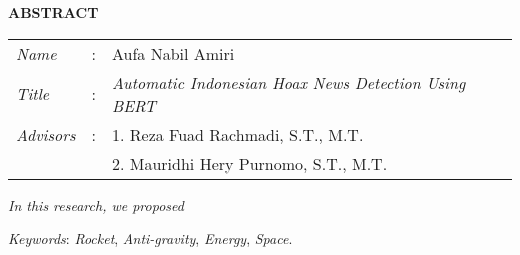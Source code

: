 \begin{center}
  \large\textbf{ABSTRACT}
\end{center}


\vspace{2ex}

\begingroup
\setlength{\tabcolsep}{0pt}

\noindent
\begin{tabularx}{\textwidth}{l >{\centering}m{3em} X}
  \emph{Name}     & : & Aufa Nabil Amiri                                             \\

  \emph{Title}    & : & \emph{ Automatic Indonesian Hoax News Detection Using BERT } \\

  \emph{Advisors} & : & 1. Reza Fuad Rachmadi, S.T., M.T.                            \\
                  &   & 2. Mauridhi Hery Purnomo, S.T., M.T.                         \\
\end{tabularx}
\endgroup

\emph{In this research, we proposed \lipsum[1]}

\emph{Keywords}: \emph{Rocket}, \emph{Anti-gravity}, \emph{Energy}, \emph{Space}.
